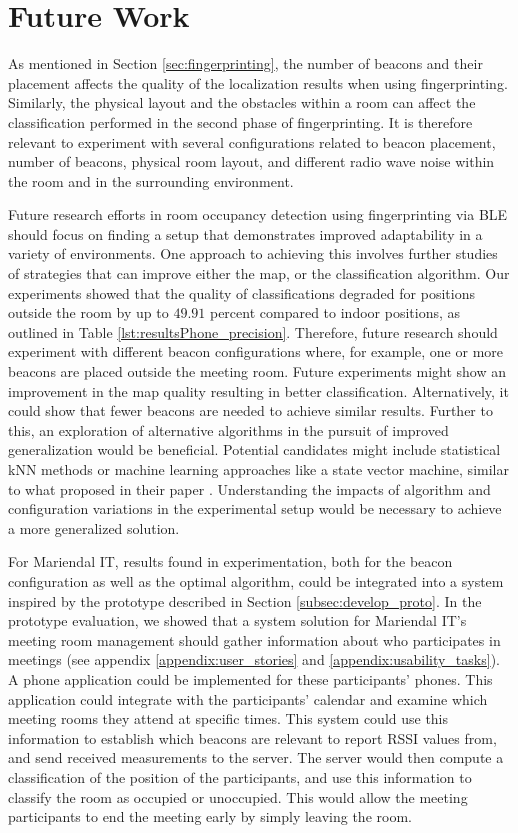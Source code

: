 \chapter{Future Work}
As mentioned in Section \ref{sec:fingerprinting}, the number of beacons and their placement affects the quality of the localization results when using fingerprinting. 
Similarly, the physical layout and the obstacles within a room can affect the classification performed in the second phase of fingerprinting. 
It is therefore relevant to experiment with several configurations related to beacon placement, number of beacons, physical room layout, and different radio wave noise within the room and in the surrounding environment. 

Future research efforts in room occupancy detection using fingerprinting via BLE should focus on finding a setup that demonstrates improved adaptability in a variety of environments.
One approach to achieving this involves further studies of strategies that can improve either the map, or the classification algorithm.
Our experiments showed that the quality of classifications degraded for positions outside the room by up to $49.91$ percent compared to indoor positions, as outlined in Table \ref{lst:resultsPhone_precision}. Therefore, future research should experiment with different beacon configurations where, for example, one or more beacons are placed outside the meeting room. 
Future experiments might show an improvement in the map quality resulting in better classification. Alternatively, it could show that fewer beacons are needed to achieve similar results. 
Further to this, an exploration of alternative algorithms in the pursuit of improved generalization would be beneficial.
Potential candidates might include statistical kNN methods or machine learning approaches like a state vector machine, similar to what \citeauthor{ble_kneares_neural} proposed in their paper \cite{ble_kneares_neural}. 
Understanding the impacts of algorithm and configuration variations in the experimental setup would be necessary to achieve a more generalized solution.

For Mariendal IT, results found in experimentation, both for the beacon configuration as well as the optimal algorithm, could be integrated into a system inspired by the prototype described in Section \ref{subsec:develop_proto}. 
In the prototype evaluation, we showed that a system solution for Mariendal IT's meeting room management should gather information about who participates in meetings (see appendix \ref{appendix:user_stories} and \ref{appendix:usability_tasks}).
A phone application could be implemented for these participants' phones. 
This application could integrate with the participants' calendar and examine which meeting rooms they attend at specific times.
This system could use this information to establish which beacons are relevant to report RSSI values from, and send received measurements to the server. 
The server would then compute a classification of the position of the participants, and use this information to classify the room as occupied or unoccupied. 
This would allow the meeting participants to end the meeting early by simply leaving the room.

